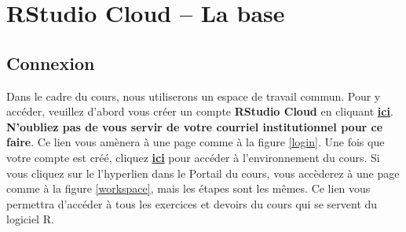 \documentclass[10.5pt,a4paper]{article}
\begin{document}
\section{RStudio Cloud -- La base}
  \subsection{Connexion}
  Dans le cadre du cours, nous utiliserons un espace de travail commun. Pour y accéder, veuillez d'abord vous créer un compte \textbf{RStudio Cloud} en cliquant \href{https://login.rstudio.cloud/register?redirect=https\%3A\%2F\%2Fclient.login.rstudio.cloud\%2Foauth\%2Flogin\%3Fshow_auth\%3D0\%26show_login\%3D0\%26show_setup\%3D0}{\textbf{ici}}. \textbf{N'oubliez pas de vous servir de votre courriel institutionnel pour ce faire}. Ce lien vous amènera à une page comme à la figure \ref{login}. Une fois que votre compte est créé, cliquez \href{https://can01.safelinks.protection.outlook.com/?url=https\%3A\%2F\%2Flogin.rstudio.cloud\%2Finvite\%3Fspace_name\%3DPOL\%2B2000-Z\%2BM\%25C3\%25A9thodes\%2Bquantitatives\%26code\%3D9tltN\%252ByVLqitCL1rVgCB\%252F\%252B0V8rk0Wtqxp\%252Fl6uW8J&amp;data=04\%7C01\%7Cwilliam.poirier.1\%40ulaval.ca\%7C9119a0b3a3fa4119007208d987439312\%7C56778bd56a3f4bd3a26593163e4d5bfe\%7C1\%7C0\%7C637689547430424200\%7CUnknown\%7CTWFpbGZsb3d8eyJWIjoiMC4wLjAwMDAiLCJQIjoiV2luMzIiLCJBTiI6Ik1haWwiLCJXVCI6Mn0\%3D\%7C0&amp;sdata=EMbletbv2\%2Bu9\%2FKSqkqJbRadybcaee2t2S2\%2F8MNRvJgQ\%3D&amp;reserved=0}{\textbf{ici}} pour accéder à l'environnement du cours. Si vous cliquez sur le l’hyperlien dans le Portail du cours, vous accèderez à une page comme à la figure \ref{workspace}, mais les étapes sont les mêmes. Ce lien vous permettra d'accéder à tous les exercices et devoirs du cours qui se servent du logiciel R.
  
\end{document}

